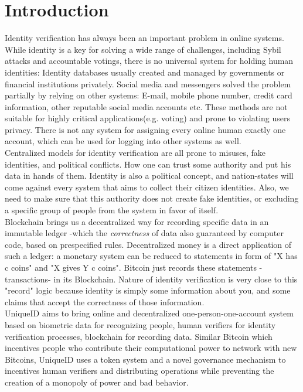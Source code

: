 \documentclass[conference]{IEEEtran}
\begin{document}
\section{Introduction}
Identity verification has always been an important problem in online systems. While identity is a key for solving a wide range of challenges, including Sybil attacks and accountable votings, there is no universal system for holding human identities: Identity databases usually created and managed by governments or financial institutions privately. Social media and messengers solved the problem partially by relying on other systems: E-mail, mobile phone number, credit card information, other reputable social media accounts etc. These methods are not suitable for highly critical applications(e.g. voting) and prone to violating users privacy. There is not any system for assigning every online human exactly one account, which can be used for logging into other systems as well.
\\
Centralized models for identity verification are all prone to misuses, fake identities, and political conflicts. How one can trust some authority and put his data in hands of them.  Identity is also a political concept, and nation-states will come against every system that aims to collect their citizen identities. Also, we need to make sure that this authority does not create fake identities, or excluding a specific group of people from the system in favor of itself.
\\
Blockchain brings us a decentralized way for recording specific data in an immutable ledger -which the \textit{correctness} of data also guaranteed by computer code, based on prespecified rules. Decentralized money is a direct application of such a ledger: a monetary system can be reduced to statements in form of "X has c coins" and "X gives Y c coins". Bitcoin just records these statements -transactions- in its Blockchain. Nature of identity verification is very close to this "record" logic because identity is simply some information about you, and some claims that accept the correctness of those information. 
\\
UniqueID aims to bring online and decentralized one-person-one-account system based on biometric data for recognizing people, human verifiers for identity verification processes, blockchain for recording data. Similar Bitcoin which incentives people who contribute their computational power to network with new Bitcoins, UniqueID uses a token system and a novel governance mechanism to incentives human verifiers and distributing operations while preventing the creation of a monopoly of power and bad behavior.
\end{document}

